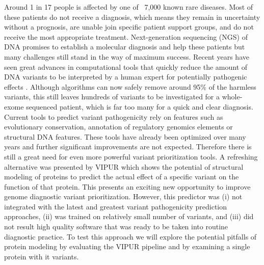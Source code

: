 Around 1 in 17 people is affected by one of ~7,000 known rare diseases. Most of these patients do not receive a diagnosis, which means they remain in uncertainty without a prognosis, are unable join specific patient support groups, and do not receive the most appropriate treatment.
Next-generation sequencing (NGS) of DNA promises to establish a molecular diagnosis and help these patients but many challenges still stand in the way of maximum success.
Recent years have seen great advances in computational tools that quickly reduce the amount of DNA variants to be interpreted by a human expert for potentially pathogenic effects \cite{}. Although algorithms can now safely remove around 95\% of the harmless variants, this still leaves hundreds of variants to be investigated for a whole-exome sequenced patient, which is far too many for a quick and clear diagnosis. Current tools to predict variant pathogenicity rely on features such as evolutionary conservation, annotation of regulatory genomics elements or structural DNA features. These tools have already been optimized over many years and further significant improvements are not expected. Therefore there is still a great need for even more powerful variant prioritization tools. 
A refreshing alternative was presented by VIPUR \cite{} which shows the potential of structural modeling of proteins to predict the actual effect of a specific variant on the function of that protein. This presents an exciting new opportunity to improve genome diagnostic variant prioritization. However, this predictor was (i) not integrated with the latest and greatest variant pathogenicity prediction approaches, (ii) was trained on relatively small number of variants, and (iii) did not result high quality software that was ready to be taken into routine diagnostic practice.
To test this approach we will explore the potential pitfalls of protein modeling by evaluating the VIPUR pipeline and by examining a single protein with it variants.